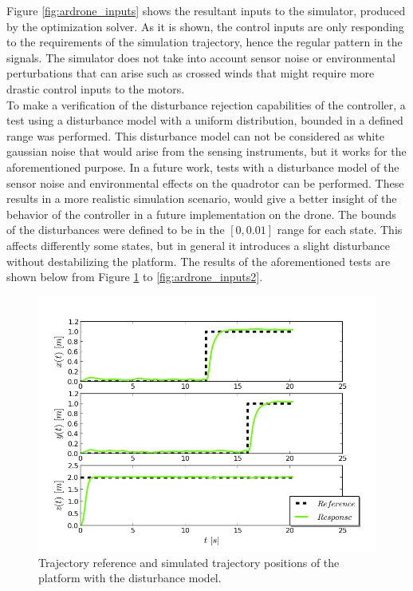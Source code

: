 Figure \ref{fig:ardrone_inputs} shows the resultant inputs to the simulator, produced by the optimization solver. As it is shown, the control inputs are only responding to the requirements of the simulation trajectory, hence the regular pattern in the signals. The simulator does not take into account sensor noise or environmental perturbations that can arise such as crossed winds that might require more drastic control inputs to the motors.  \\

To make a verification of the disturbance rejection capabilities of the controller, a test using a disturbance model with a uniform distribution, bounded in a defined range was performed. This disturbance model can not be considered as white gaussian noise that would arise from the sensing instruments, but it works for the aforementioned purpose. In a future work, tests with a disturbance model of the sensor noise and environmental effects on the quadrotor can be performed. These results in a more realistic simulation scenario, would give a better insight of the behavior of the controller in a future implementation on the drone. The bounds of the disturbances were defined to be in the $[0, 0.01]$ range for each state. This affects differently some states, but in general it introduces a slight disturbance without destabilizing the platform. The results of the aforementioned tests are shown below from Figure \ref{fig:ardrone_pos2} to \ref{fig:ardrone_inputs2}.\\

\begin{figure}[H]
\centering
\includegraphics[scale=0.7]{Images/Chapter5/ardrone/T1_noise/position_control.png}
\caption{Trajectory reference and simulated trajectory positions of the platform with the disturbance model.}
\label{fig:ardrone_pos2}
\end{figure}

